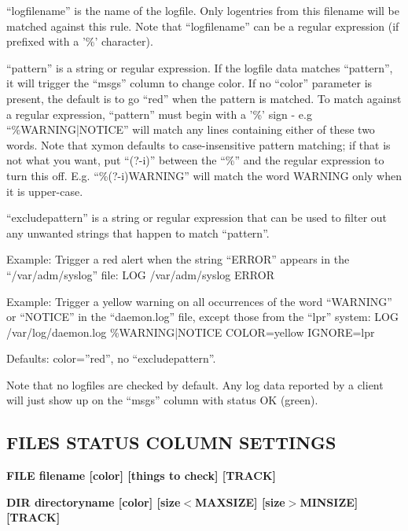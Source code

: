   ``logfilename'' is the name of the logfile. Only logentries from this filename will be matched against this rule. Note that ``logfilename'' can be a regular expression (if prefixed with a '\%' character). 


  ``pattern'' is a string or regular expression. If the logfile data matches ``pattern'', it will trigger the ``msgs'' column to change color. If no ``color'' parameter is present, the default is to go ``red'' when the pattern is matched. To match against a regular expression, ``pattern'' must begin with a '\%' sign - e.g ``\%WARNING|NOTICE'' will match any lines containing either of these two words. Note that xymon defaults to case-insensitive pattern matching; if that is not what you want, put ``(?-i)'' between the ``\%'' and the regular expression to turn this off. E.g. ``\%(?-i)WARNING'' will match the word WARNING only when it is upper-case. 


  ``excludepattern'' is a string or regular expression that can be used to filter out any unwanted strings that happen to match ``pattern''. 


  Example: Trigger a red alert when the string ``ERROR'' appears in the ``/var/adm/syslog'' file:  
LOG /var/adm/syslog ERROR 



  Example: Trigger a yellow warning on all occurrences of the word ``WARNING'' or ``NOTICE'' in the ``daemon.log'' file, except those from the ``lpr'' system:  
LOG /var/log/daemon.log \%WARNING|NOTICE COLOR=yellow IGNORE=lpr 



  Defaults:  
color=''red'', no ``excludepattern''. 



  Note that no logfiles are checked by default. Any log data reported by a client will just show up on the ``msgs'' column with status OK (green). 


 


 
\subsection{FILES STATUS COLUMN SETTINGS}


 \textbf{FILE filename [color] [things to check] [TRACK]}



 \textbf{DIR directoryname [color] [size$<$MAXSIZE] [size$>$MINSIZE] [TRACK]}



